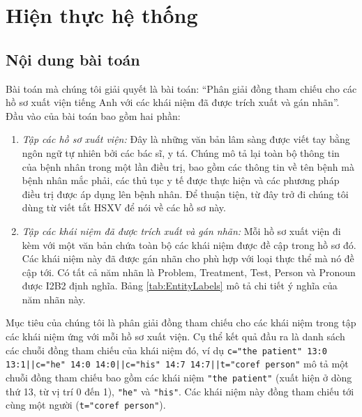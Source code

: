 \chapter{Hiện thực hệ thống} \label{hienthuchethong}
\section{Nội dung bài toán}
Bài toán mà chúng tôi giải quyết là bài toán: ``Phân giải đồng tham chiếu cho các hồ sơ xuất viện tiếng Anh với các khái niệm đã được trích xuất và gán nhãn''. Đầu vào của bài toán bao gồm hai phần:

\begin{enumerate}[leftmargin=\the\parindent]
\item \emph{Tập các hồ sơ xuất viện: }Đây là những văn bản lâm sàng được viết tay bằng ngôn ngữ tự nhiên bởi các bác sĩ, y tá. Chúng mô tả lại toàn bộ thông tin của bệnh nhân trong một lần điều trị, bao gồm các thông tin về tên bệnh mà bệnh nhân mắc phải, các thủ tục y tế được thực hiện và các phương pháp điều trị được áp dụng lên bệnh nhân. Để thuận tiện, từ đây trở đi chúng tôi dùng từ viết tắt HSXV để nói về các hồ sơ này.
\item \emph{Tập các khái niệm đã được trích xuất và gán nhãn:} Mỗi hồ sơ xuất viện đi kèm với một văn bản chứa toàn bộ các khái niệm được đề cập trong hồ sơ đó. Các khái niệm này đã được gán nhãn cho phù hợp với loại thực thể mà nó đề cập tới. Có tất cả năm nhãn là Problem, Treatment, Test, Person và Pronoun được I2B2 định nghĩa. Bảng \ref{tab:EntityLabels} mô tả chi tiết ý nghĩa của năm nhãn này.
\end{enumerate}

Mục tiêu của chúng tôi là phân giải đồng tham chiếu cho các khái niệm trong tập các khái niệm ứng với mỗi hồ sơ xuất viện. Cụ thể kết quả đầu ra là danh sách các chuỗi đồng tham chiếu của khái niệm đó, ví dụ \texttt{c="the patient" 13:0 13:1||c="he" 14:0 14:0||c="his" 14:7 14:7||t="coref person"} mô tả một chuỗi đồng tham chiếu bao gồm các khái niệm \texttt{"the patient"} (xuất hiện ở dòng thứ 13, từ vị trí 0 đến 1), \texttt{"he"} và \texttt{"his"}. Các khái niệm này đồng tham chiếu tới cùng một người (\texttt{t="coref person"}).

